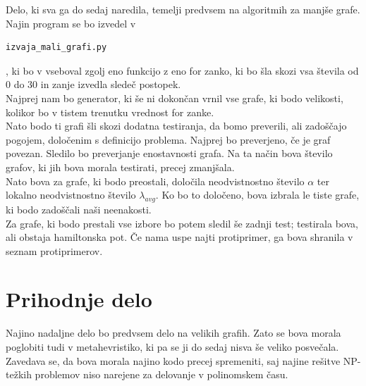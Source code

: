 \documentclass[12pt,a4paper]{amsart}
\begin{document}
Delo, ki sva ga do sedaj naredila, temelji predvsem na algoritmih za manjše grafe. Najin program se bo izvedel v \begin{verbatim}
izvaja_mali_grafi.py
\end{verbatim}, ki bo v vseboval zgolj eno funkcijo z eno for zanko, ki bo šla skozi vsa števila od 0 do 30 in zanje izvedla sledeč postopek.\\
Najprej nam bo generator, ki še ni dokončan vrnil vse grafe, ki bodo velikosti, kolikor bo v tistem trenutku vrednost for zanke.\\
 Nato bodo ti grafi šli skozi dodatna testiranja, da bomo preverili, ali zadoščajo pogojem, določenim s definicijo problema. Najprej bo preverjeno, če je graf povezan. Sledilo bo preverjanje enostavnosti grafa. Na ta način bova število grafov, ki jih bova morala testirati, precej zmanjšala. \\
 Nato bova za grafe, ki bodo preostali, določila neodvistnostno število $\alpha$ ter lokalno neodvistnostno število $\lambda_{avg}$. Ko bo to določeno, bova izbrala le tiste grafe, ki bodo zadoščali naši neenakosti. \\
 Za grafe, ki bodo prestali vse izbore bo potem sledil še zadnji test; testirala bova, ali obstaja hamiltonska pot. Če nama uspe najti protiprimer, ga bova shranila v seznam protiprimerov.
\section{Prihodnje delo}
Najino nadaljne delo bo predvsem delo na velikih grafih. Zato se bova morala poglobiti tudi v metahevristiko, ki pa se ji do sedaj nisva še veliko posvečala. Zavedava se, da bova morala najino kodo precej spremeniti, saj najine rešitve NP-težkih problemov niso narejene za delovanje v polinomskem času.
\end{document}

